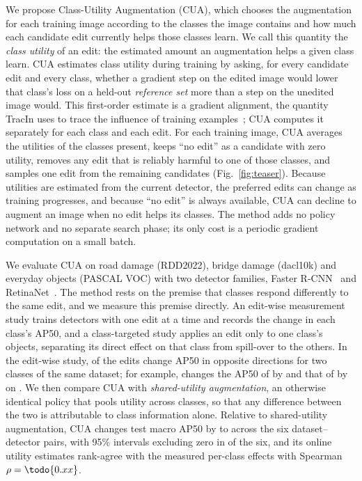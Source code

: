 We propose Class-Utility Augmentation (CUA), which chooses the augmentation for each training image according to the classes the image contains and how much each candidate edit currently helps those classes learn. We call this quantity the \emph{class utility} of an edit: the estimated amount an augmentation helps a given class learn. CUA estimates class utility during training by asking, for every candidate edit and every class, whether a gradient step on the edited image would lower that class's loss on a held-out \emph{reference set} more than a step on the unedited image would. This first-order estimate is a gradient alignment, the quantity TracIn uses to trace the influence of training examples~\cite{pruthi2020tracin}; CUA computes it separately for each class and each edit. For each training image, CUA averages the utilities of the classes present, keeps ``no edit'' as a candidate with zero utility, removes any edit that is reliably harmful to one of those classes, and samples one edit from the remaining candidates (Fig.~\ref{fig:teaser}). Because utilities are estimated from the current detector, the preferred edits can change as training progresses, and because ``no edit'' is always available, CUA can decline to augment an image when no edit helps its classes. The method adds no policy network and no separate search phase; its only cost is a periodic gradient computation on a small batch.

We evaluate CUA on road damage (RDD2022), bridge damage (dacl10k) and everyday objects (PASCAL VOC) with two detector families, Faster R-CNN~\cite{ren2017faster} and RetinaNet~\cite{lin2017focal}. The method rests on the premise that classes respond differently to the same edit, and we measure this premise directly. An edit-wise measurement study trains detectors with one edit at a time and records the change in each class's AP50, and a class-targeted study applies an edit only to one class's objects, separating its direct effect on that class from spill-over to the others. In the edit-wise study,  of the  edits change AP50 in opposite directions for two classes of the same dataset; for example,  changes the AP50 of  by  and that of  by  on . We then compare CUA with \emph{shared-utility augmentation}, an otherwise identical policy that pools utility across classes, so that any difference between the two is attributable to class information alone. Relative to shared-utility augmentation, CUA changes test macro AP50 by  to  across the six dataset--detector pairs, with 95\% intervals excluding zero in  of the six, and its online utility estimates rank-agree with the measured per-class effects with Spearman $\rho=\todo{0.xx}$.

